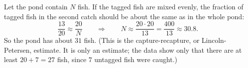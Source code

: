 Let the pond contain $N$ fish. If the tagged fish are mixed evenly, the fraction of tagged fish in the second catch should be about the same as in the whole pond:
\[
\dfrac{13}{20}\approx\dfrac{20}{N}\qquad\Longrightarrow\qquad N\approx\dfrac{20\cdot20}{13}=\dfrac{400}{13}\approx30.8 .
\]
So the pond has about $\boxed{31}$ fish. (This is the capture-recapture, or Lincoln-Petersen, estimate. It is only an estimate; the data show only that there are at least $20+7=27$ fish, since $7$ untagged fish were caught.)
